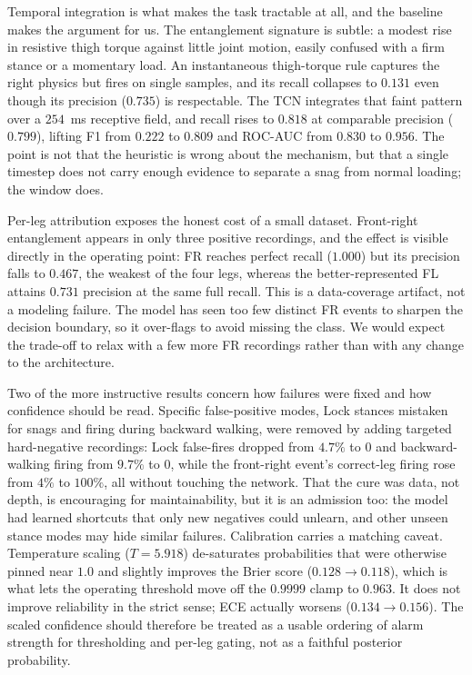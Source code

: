 \documentclass[conference]{IEEEtran}
\begin{document}
Temporal integration is what makes the task tractable at all, and the baseline makes the argument for us. The entanglement signature is subtle: a modest rise in resistive thigh torque against little joint motion, easily confused with a firm stance or a momentary load. An instantaneous thigh-torque rule captures the right physics but fires on single samples, and its recall collapses to $0.131$ even though its precision ($0.735$) is respectable. The TCN integrates that faint pattern over a $254$~ms receptive field, and recall rises to $0.818$ at comparable precision ($0.799$), lifting F1 from $0.222$ to $0.809$ and ROC-AUC from $0.830$ to $0.956$. The point is not that the heuristic is wrong about the mechanism, but that a single timestep does not carry enough evidence to separate a snag from normal loading; the window does.

Per-leg attribution exposes the honest cost of a small dataset. Front-right entanglement appears in only three positive recordings, and the effect is visible directly in the operating point: FR reaches perfect recall ($1.000$) but its precision falls to $0.467$, the weakest of the four legs, whereas the better-represented FL attains $0.731$ precision at the same full recall. This is a data-coverage artifact, not a modeling failure. The model has seen too few distinct FR events to sharpen the decision boundary, so it over-flags to avoid missing the class. We would expect the trade-off to relax with a few more FR recordings rather than with any change to the architecture.

Two of the more instructive results concern how failures were fixed and how confidence should be read. Specific false-positive modes, Lock stances mistaken for snags and firing during backward walking, were removed by adding targeted hard-negative recordings: Lock false-fires dropped from $4.7\%$ to $0$ and backward-walking firing from $9.7\%$ to $0$, while the front-right event's correct-leg firing rose from $4\%$ to $100\%$, all without touching the network. That the cure was data, not depth, is encouraging for maintainability, but it is an admission too: the model had learned shortcuts that only new negatives could unlearn, and other unseen stance modes may hide similar failures. Calibration carries a matching caveat. Temperature scaling ($T=5.918$) de-saturates probabilities that were otherwise pinned near $1.0$ and slightly improves the Brier score ($0.128\rightarrow0.118$), which is what lets the operating threshold move off the $0.9999$ clamp to $0.963$. It does not improve reliability in the strict sense; ECE actually worsens ($0.134\rightarrow0.156$). The scaled confidence should therefore be treated as a usable ordering of alarm strength for thresholding and per-leg gating, not as a faithful posterior probability.
\end{document}
